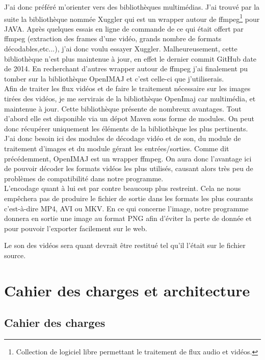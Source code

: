 \documentclass[10pt,a4paper]{article}
\begin{document}
J'ai donc préféré m'orienter vers des bibliothèques multimédias. J'ai trouvé par la suite la bibliothèque nommée Xuggler\cite{xuggler} qui est un wrapper autour de
ffmpeg\footnote{Collection de logiciel libre permettant le traitement de flux audio et vidéos.} pour JAVA. Après quelques essais en ligne de commande de ce qui était offert
par ffmpeg (extraction des frames d'une vidéo, grands nombre de formats décodables,etc...), j'ai donc voulu essayer Xuggler. Malheureusement, cette bibliothèque n'est plus maintenue à jour, en effet le dernier
commit GitHub date de 2014\cite{xugglergit}. En recherchant d'autres wrapper autour de ffmpeg j'ai finalement pu tomber sur la bibliothèque OpenIMAJ\cite{openimaj} et c'est celle-ci que j'utiliserais.\\

Afin de traiter les flux vidéos et de faire le traitement nécessaire sur les images tirées des vidéos, je me servirais de  la bibliothèque OpenImaj car multimédia, et maintenue à jour.
Cette bibliothèque présente de nombreux avantages. Tout d'abord elle est
disponible via un dépot Maven sous forme de modules\cite{openimajmvn}. On peut donc récupérer uniquement les éléments de la bibliothèque
les plus pertinents. J'ai donc besoin ici des modules de décodage vidéo et de son, du module de traitement d'images
et du module gérant les entrées/sorties.
Comme dit précédemment, OpenIMAJ est un wrapper ffmpeg. On aura donc l'avantage ici de pouvoir décoder les formats vidéos
les plus utilisés, causant alors très peu de problèmes de compatibilité dans notre
programme.\\

L'encodage quant à lui est par contre beaucoup plus restreint. Cela ne nous empêchera pas de produire
le fichier de sortie dans les formats les plus courants c'est-à-dire MP4, AVI ou MKV.
En ce qui concerne l'image, notre programme donnera en sortie une image au format PNG afin d'éviter la perte de donnée et
pour pouvoir l'exporter facilement sur le web.

Le son des vidéos sera quant devrait être restitué tel qu'il l'était sur le fichier source.

\section{Cahier des charges et architecture}

\subsection{Cahier des charges}
\end{document}
